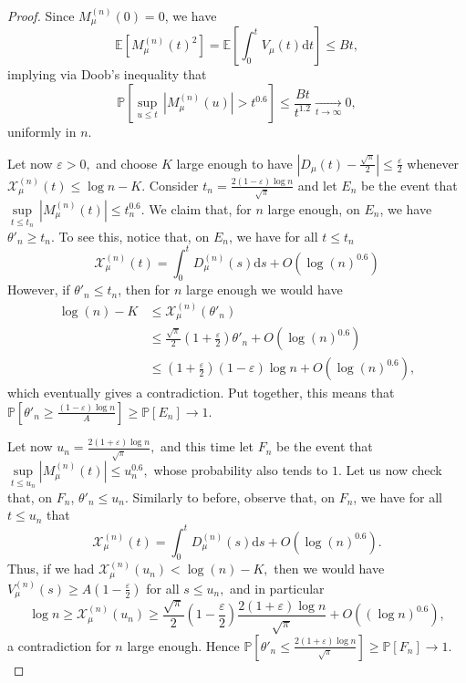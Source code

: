 \documentclass[11pt]{article}
\newcommand{\Xmun}{\mathcal{X}^{(n)}_{\mu}}
\newcommand{\E}{\mathbb{E}}
\newcommand{\veps}{\varepsilon}
\newcommand{\pr}{\mathbb{P}}
\renewcommand{\geq}{\geqslant}
\renewcommand{\leq}{\leqslant}
\begin{document}
\begin{proof}
\vspace{1cm}

Since $M^{(n)}_{\mu}(0)=0$, we have
\[\E[M^{(n)}_{\mu}(t)^2]=\E\left[\int_{0}^t V_{\mu}(t)\mathrm d t\right]\leq Bt,\]
implying via Doob's inequality that
\[\pr[\underset{u\leq t} \sup \, |M^{(n)}_{\mu}(u)|>t^{0.6}]\leq \frac{Bt}{t^{1.2}} \underset{t\to\infty}\longrightarrow 0, \]
uniformly in $n$.

Let now $\veps>0,$ and choose $K$ large enough to have $|D_{\mu}(t)-\frac{\sqrt{\pi}}{2}|\leq \frac{\veps}{2}$ whenever $\Xmun(t)\leq \log n - K.$ Consider $t_n=\frac{2(1-\veps)\log n}{\sqrt{\pi}}$ and let $E_n$ be the event that $\underset{t\leq t_n}\sup \,|M^{(n)}_{\mu}(t) |\leq t_n^{0.6}$. We claim that, for $n$ large enough, on $E_n$, we have $\theta'_n\geq t_n.$ To see this, notice that, on $E_n$, we have for all $t\leq t_n$
\[\Xmun(t)=\int_0^t D^{(n)}_{\mu}(s)\mathrm ds + O(\log(n)^{0.6}) \]
However, if $\theta'_n\leq t_n$, then for $n$ large enough we would have
\begin{align*}
\log(n)-K &\leq \Xmun(\theta'_n)\\
&\leq \frac{\sqrt{\pi}}{2}(1+\frac{\veps}{2})\theta'_n +O(\log(n)^{0.6}) \\
   &\leq (1+\frac{\veps}{2})(1-\veps)\log n +O(\log(n)^{0.6}),
\end{align*}
which eventually gives a contradiction. Put together, this means that $\pr[\theta'_n\geq \frac{(1-\veps)\log n}{A}]\geq \pr[E_n] \to 1.$

Let now $u_n=\frac{2(1+\veps)\log n}{\sqrt{\pi}},$ and this time let $F_n$ be the event that $\underset{t\leq u_n}\sup| M^{(n)}_{\mu}(t)| \leq u_n^{0.6},$ whose probability also tends to $1$. Let us now check that, on $F_n$, $\theta'_n\leq u_n.$ Similarly to before, observe that, on $F_n$, we have for all $t\leq u_n$ that 
\[\Xmun(t)=\int_0^t D^{(n)}_{\mu}(s)\mathrm ds + O(\log(n)^{0.6}). \]
Thus, if we had $\Xmun(u_n)< \log(n)-K,$
then we would have $V^{(n)}_{\mu}(s)\geq A(1-\frac{\veps}{2})$ for all $s\leq u_n,$ and in particular
\[
\log n \geq \Xmun(u_n)\geq \frac{\sqrt{\pi}}{2}(1-\frac{\veps}{2})\frac{2(1+\veps)\log n}{\sqrt{\pi}}+ O((\log n)^{0.6}),\]
a contradiction for $n$ large enough. Hence $\pr[\theta'_n\leq \frac{2(1+\veps)\log n}{\sqrt{\pi}}]\geq \pr[F_n]\rightarrow 1.$





\end{proof}
\end{document}
